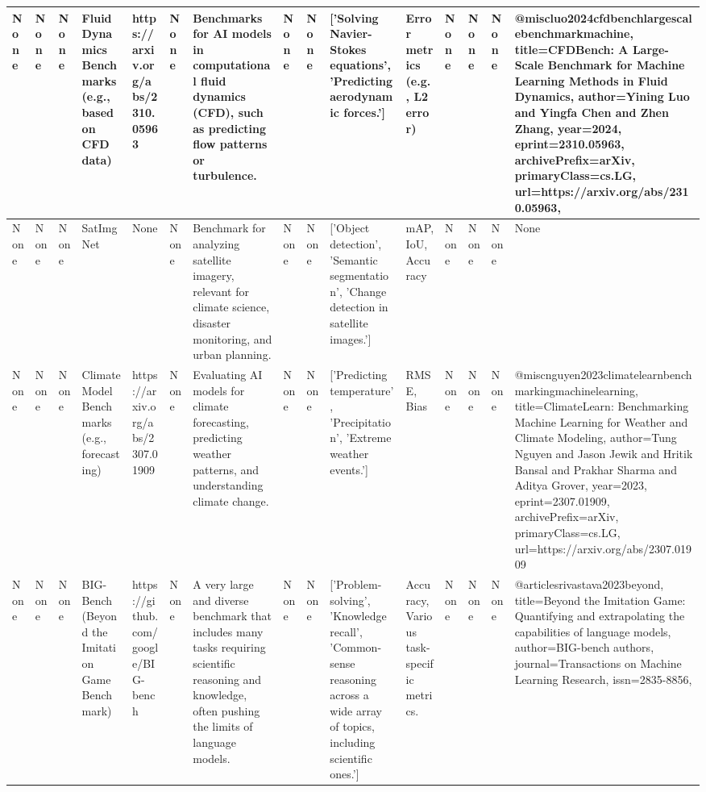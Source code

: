 \begin{table}[h!]
\begin{tabular}{|l | l | l | l | l | l | l | l | l | l | l | l | l | l | l|}
None & None & None & Fluid Dynamics Benchmarks (e.g., based on CFD data) & https://arxiv.org/abs/2310.05963 & None & Benchmarks for AI models in computational fluid dynamics (CFD), such as predicting flow patterns or turbulence. & None & None & ['Solving Navier-Stokes equations', 'Predicting aerodynamic forces.'] & Error metrics (e.g., L2 error) & None & None & None & @misc{luo2024cfdbenchlargescalebenchmarkmachine,
    title={CFDBench: A Large-Scale Benchmark for Machine Learning Methods in Fluid Dynamics}, 
    author={Yining Luo and Yingfa Chen and Zhen Zhang},
    year={2024},
    eprint={2310.05963},
    archivePrefix={arXiv},
    primaryClass={cs.LG},
    url={https://arxiv.org/abs/2310.05963}, 
}
 \\ \hline
None & None & None & SatImgNet & None & None & Benchmark for analyzing satellite imagery, relevant for climate science, disaster monitoring, and urban planning. & None & None & ['Object detection', 'Semantic segmentation', 'Change detection in satellite images.'] & mAP, IoU, Accuracy & None & None & None & None \\ \hline
None & None & None & Climate Model Benchmarks (e.g., forecasting) & https://arxiv.org/abs/2307.01909 & None & Evaluating AI models for climate forecasting, predicting weather patterns, and understanding climate change. & None & None & ['Predicting temperature', 'Precipitation', 'Extreme weather events.'] & RMSE, Bias & None & None & None & @misc{nguyen2023climatelearnbenchmarkingmachinelearning,
  title={ClimateLearn: Benchmarking Machine Learning for Weather and Climate Modeling}, 
  author={Tung Nguyen and Jason Jewik and Hritik Bansal and Prakhar Sharma and Aditya Grover},
  year={2023},
  eprint={2307.01909},
  archivePrefix={arXiv},
  primaryClass={cs.LG},
  url={https://arxiv.org/abs/2307.01909}
}
 \\ \hline
None & None & None & BIG-Bench (Beyond the Imitation Game Benchmark) & https://github.com/google/BIG-bench & None & A very large and diverse benchmark that includes many tasks requiring scientific reasoning and knowledge, often pushing the limits of language models. & None & None & ['Problem-solving', 'Knowledge recall', 'Common-sense reasoning across a wide array of topics, including scientific ones.'] & Accuracy, Various task-specific metrics. & None & None & None & @article{srivastava2023beyond,
  title={Beyond the Imitation Game: Quantifying and extrapolating the capabilities of language models},
  author={BIG-bench authors},
  journal={Transactions on Machine Learning Research},
  issn={2835-8856},
}
\end{tabular}
\end{table}
